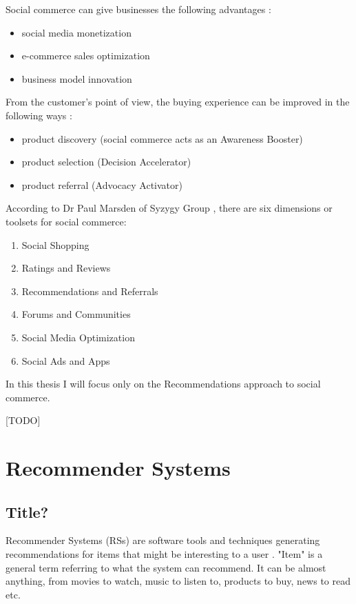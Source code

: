 \documentclass[12pt]{report}
\begin{document}

Social commerce can give businesses the following advantages \cite{social_commerce_syzygy}:
\begin{itemize}
\item social media monetization
\item e-commerce sales optimization
\item business model innovation
\end{itemize}

From the customer's point of view, the buying experience can be improved in the following ways \cite{social_commerce_syzygy}:
\begin{itemize}
\item product discovery (social commerce acts as an Awareness Booster)
\item product selection (Decision Accelerator)
\item product referral (Advocacy Activator)
\end{itemize}

According to Dr Paul Marsden of Syzygy Group \cite{social_commerce_syzygy}, there are six dimensions or toolsets for social commerce:
\begin{enumerate}
\item Social Shopping
\item Ratings and Reviews
\item Recommendations and Referrals
\item Forums and Communities
\item Social Media Optimization
\item Social Ads and Apps
\end{enumerate}

In this thesis I will focus only on the Recommendations approach to social commerce.

[TODO]

\section{Recommender Systems}

\subsection{Title?}

Recommender Systems (RSs) are software tools and techniques generating recommendations for items that might be interesting to a user \cite{rec_sys_handbook}. "Item" is a general term referring to what the system can recommend. It can be almost anything, from movies to watch, music to listen to, products to buy, news to read etc.
\end{document}
